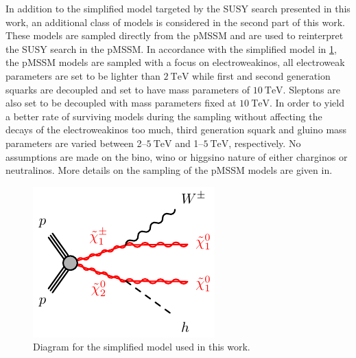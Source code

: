 In addition to the simplified model targeted by the SUSY search presented in this work, an additional class of models is considered in the second part of this work. These models are sampled directly from the pMSSM and are used to reinterpret the SUSY search in the pMSSM. In accordance with the simplified model in \cref{fig:Wh_model}, the pMSSM models are sampled with a focus on electroweakinos, \ie all electroweak parameters are set to be lighter than $\SI{2}{\TeV}$ while first and second generation squarks are decoupled and set to have mass parameters of $\SI{10}{\TeV}$. Sleptons are also set to be decoupled with mass parameters fixed at $\SI{10}{\TeV}$.  In order to yield a better rate of surviving models during the sampling without affecting the decays of the electroweakinos too much, third generation squark and gluino mass parameters are varied between 2--$\SI{5}{\TeV}$ and 1--$\SI{5}{\TeV}$, respectively. No assumptions are made on the bino, wino or higgsino nature of either charginos or neutralinos. More details on the sampling of the pMSSM models are given in. 

\begin{figure}
	\centering\includegraphics[width=.4\textwidth]{C1N2-WhN1N1}
	\caption{Diagram for the simplified model used in this work.}\label{fig:Wh_model}
\end{figure}


